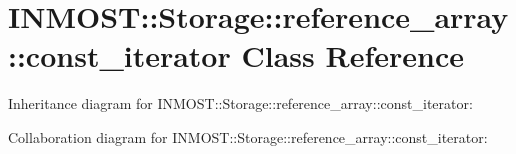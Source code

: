 \hypertarget{classINMOST_1_1Storage_1_1reference__array_1_1const__iterator}{\section{I\-N\-M\-O\-S\-T\-:\-:Storage\-:\-:reference\-\_\-array\-:\-:const\-\_\-iterator Class Reference}
\label{classINMOST_1_1Storage_1_1reference__array_1_1const__iterator}
}


Inheritance diagram for I\-N\-M\-O\-S\-T\-:\-:Storage\-:\-:reference\-\_\-array\-:\-:const\-\_\-iterator\-:


Collaboration diagram for I\-N\-M\-O\-S\-T\-:\-:Storage\-:\-:reference\-\_\-array\-:\-:const\-\_\-iterator\-:
